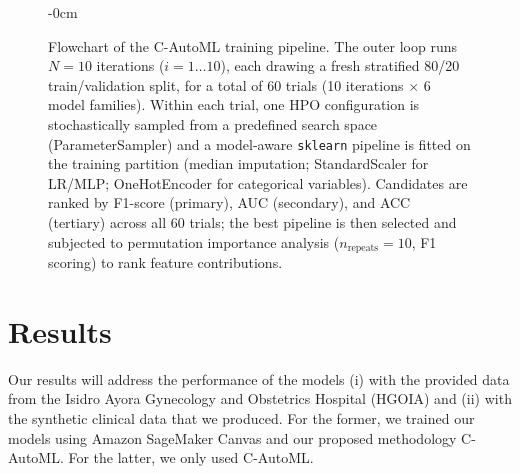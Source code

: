 \documentclass[diagnostics,article,accept,pdftex,moreauthors]{Definitions/mdpi}
\begin{document}
\begin{figure}[H]
\begin{adjustwidth}{-\extralength}{0cm}
\end{adjustwidth}

\caption{{Flowchart} %
 of the \ac{C-AutoML} training
    pipeline. The outer loop runs $N = 10$ iterations
    ($i = 1\ldots10$), each drawing a fresh stratified 80/20
    train/validation split, for a total of 60 trials
    (10 iterations $\times$ 6 model families). Within each trial, one
    \acf{HPO} configuration is stochastically sampled from a
    predefined search space (ParameterSampler) and a model-aware
    \texttt{sklearn} pipeline is fitted on the training partition
    (median imputation; StandardScaler for \ac{LR}/\ac{MLP};
    OneHotEncoder for categorical variables). Candidates are ranked by
    F1-score (primary), \ac{AUC} (secondary), and \ac{ACC} (tertiary)
    across all 60 trials; the best pipeline is then selected and
    subjected to permutation importance analysis
    ($n_{\mathrm{repeats}} = 10$, F1 scoring) to rank feature
    contributions.}
\label{fig:c-automl-flowchart}
\end{figure}



\section{Results}
\label{sec:results}
Our results will address the performance of the models (i) with the
provided data from the Isidro Ayora Gynecology and Obstetrics {Hospital}
(\ac{HGOIA}) %
and (ii) with the synthetic clinical data that we produced. For the
former, we trained our models using Amazon SageMaker Canvas and our
proposed methodology \ac{C-AutoML}. For the latter, we only used
\ac{C-AutoML}.
\end{document}
